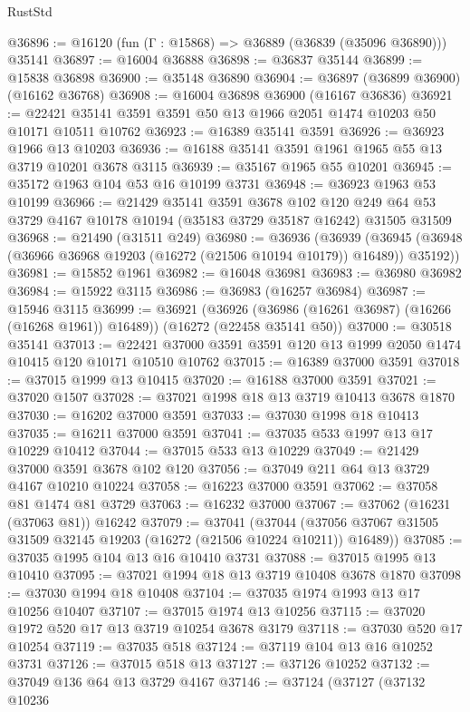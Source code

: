 \begin{lexlean}{RustStd}
\begin{coremodule}
@36896 := @16120 (fun (Γ : @15868) => @36889 (@36839 (@35096 @36890))) @35141
@36897 := @16004 @36888
@36898 := @36837 @35144
@36899 := @15838 @36898
@36900 := @35148 @36890
@36904 := @36897 (@36899 @36900) (@16162 @36768)
@36908 := @16004 @36898 @36900 (@16167 @36836)
@36921 := @22421 @35141 @3591 @3591 @50 @13 @1966 @2051 @1474 @10203 @50 @10171 @10511 @10762
@36923 := @16389 @35141 @3591
@36926 := @36923 @1966 @13 @10203
@36936 := @16188 @35141 @3591 @1961 @1965 @55 @13 @3719 @10201 @3678 @3115
@36939 := @35167 @1965 @55 @10201
@36945 := @35172 @1963 @104 @53 @16 @10199 @3731
@36948 := @36923 @1963 @53 @10199
@36966 := @21429
    @35141
    @3591
    @3678
    @102
    @120
    @249
    @64
    @53
    @3729
    @4167
    @10178
    @10194
    (@35183 @3729 @35187 @16242)
    @31505
    @31509
@36968 := @21490 (@31511 @249)
@36980 := @36936
    (@36939 (@36945 (@36948 (@36966 @36968 @19203 (@16272 (@21506 @10194 @10179)) @16489)) @35192))
@36981 := @15852 @1961
@36982 := @16048 @36981
@36983 := @36980 @36982
@36984 := @15922 @3115
@36986 := @36983 (@16257 @36984)
@36987 := @15946 @3115
@36999 := @36921
    (@36926 (@36986 (@16261 @36987) (@16266 (@16268 @1961)) @16489))
    (@16272 (@22458 @35141 @50))
@37000 := @30518 @35141
@37013 := @22421 @37000 @3591 @3591 @120 @13 @1999 @2050 @1474 @10415 @120 @10171 @10510 @10762
@37015 := @16389 @37000 @3591
@37018 := @37015 @1999 @13 @10415
@37020 := @16188 @37000 @3591
@37021 := @37020 @1507
@37028 := @37021 @1998 @18 @13 @3719 @10413 @3678 @1870
@37030 := @16202 @37000 @3591
@37033 := @37030 @1998 @18 @10413
@37035 := @16211 @37000 @3591
@37041 := @37035 @533 @1997 @13 @17 @10229 @10412
@37044 := @37015 @533 @13 @10229
@37049 := @21429 @37000 @3591 @3678 @102 @120
@37056 := @37049 @211 @64 @13 @3729 @4167 @10210 @10224
@37058 := @16223 @37000 @3591
@37062 := @37058 @81 @1474 @81 @3729
@37063 := @16232 @37000
@37067 := @37062 (@16231 (@37063 @81)) @16242
@37079 := @37041
    (@37044 (@37056 @37067 @31505 @31509 @32145 @19203 (@16272 (@21506 @10224 @10211)) @16489))
@37085 := @37035 @1995 @104 @13 @16 @10410 @3731
@37088 := @37015 @1995 @13 @10410
@37095 := @37021 @1994 @18 @13 @3719 @10408 @3678 @1870
@37098 := @37030 @1994 @18 @10408
@37104 := @37035 @1974 @1993 @13 @17 @10256 @10407
@37107 := @37015 @1974 @13 @10256
@37115 := @37020 @1972 @520 @17 @13 @3719 @10254 @3678 @3179
@37118 := @37030 @520 @17 @10254
@37119 := @37035 @518
@37124 := @37119 @104 @13 @16 @10252 @3731
@37126 := @37015 @518 @13
@37127 := @37126 @10252
@37132 := @37049 @136 @64 @13 @3729 @4167
@37146 := @37124
    (@37127
      (@37132
        @10236

\end{coremodule}
\end{lexlean}
